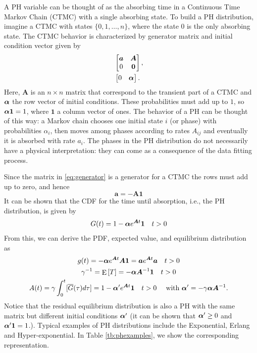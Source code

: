 \documentclass[USenglish,10pt]{article}
\newcommand{\ie}{i.e.\xspace}
\newcommand{\Gb}{\overline{G}\xspace}
\newcommand{\bA}{\ensuremath{\bm A}\xspace}
\newcommand{\bal}{\ensuremath\bm{\alpha}\xspace}
\newcommand{\ba}{\ensuremath{\bm a}\xspace}
\newcommand{\one}{\ensuremath{\bm 1}\xspace}
\DeclareMathOperator{\Exp}{E}       %
\newcommand{\E}[1]{\Exp\left[{#1}\right]}       %
\begin{document}
A PH variable can be thought of as the absorbing time in a Continuous Time Markov Chain (CTMC) with a single absorbing state.
To build a PH distribution, imagine a CTMC with states $\{0,1,\ldots,n\}$, where the state $0$ is the only absorbing state.
The CTMC behavior is characterized by generator matrix and initial condition vector given by
\begin{align}
	&\begin{bmatrix}
		\ba  & \bA \\
		0    & {\bm{0}}
	\end{bmatrix}, 	\label{eq:generator}\\
	&\begin{bmatrix}
		 0 & \bal
	\end{bmatrix}.
\end{align}
Here, $\bA$ is an $n\times n$ matrix that correspond to the transient part of a CTMC and $\bal$ the row vector of initial conditions. These probabilities must add up to $1$, so $\bal\one=1$, where $\one$ a column vector of ones. The behavior of a PH can be thought of this way: a Markov chain chooses one initial state $i$ (or phase) with probabilities $\alpha_i$,  then moves among phases according to rates $A_{ij}$ and eventually it is absorbed with rate $a_i$. The phases in the PH distribution do not necessarily have a physical interpretation: they can come as a consequence of the data fitting process.

Since the matrix in \eqref{eq:generator} is a generator for a CTMC the rows must add up to zero, and hence
\begin{equation}\label{eq:sumA}
	\ba = -\bA\one
\end{equation}
It can be shown that the CDF for the time until absorption, \ie, the PH distribution, is given by
\begin{equation*}
G(t) = 1 - \bal e^{\bA t} \one \quad t>0
\end{equation*}
From this, we can derive the PDF, expected value, and equilibrium distribution as
\begin{gather}
g(t) =  -\bal e^{\bA t} \bA\one=\ba e^{\bA t} \ba \quad t>0 \\
\gamma^{-1} = \E{T} = - \bal \bA^{-1} \one \quad t>0 \\
A(t) =\gamma \int_0^t[\Gb(\tau)d\tau] = 1 - \bal'e^{\bA t} \one  \quad t>0
      \quad  \text{ with }  \bal'=-\gamma\bal \bA^{-1}.
\end{gather}
Notice that the residual equilibrium distribution is also a PH with the same matrix but different initial conditions $\bal'$ (it can be shown that $\bal'\geq 0$ and $\bal'\one=1$.). Typical examples of PH distributions include the Exponential, Erlang and Hyper-exponential. In Table \ref{tb:phexamples}, we show the corresponding representation.
\end{document}
